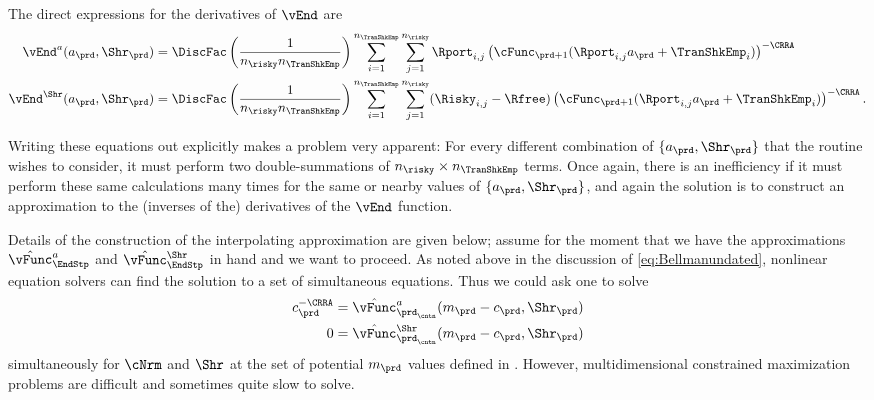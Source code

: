 The direct expressions for the derivatives of $\vEnd$ are
\begin{equation}\begin{gathered}\begin{aligned}
      \vEnd^{{a}}({a}_{\prd},\Shr_{\prd})  & = \DiscFac \left(\frac{1}{n_{\risky} n_{\TranShkEmp}}\right)\sum_{i=1}^{n_{\TranShkEmp}}\sum_{j=1}^{n_{\risky} }\Rport_{i,j} \left(\cFunc_{\prd+1}(\Rport_{i,j}{a}_{\prd}+\TranShkEmp_{i})\right)^{-\CRRA}
      \\      \vEnd^{\Shr}({a}_{\prd},\Shr_{\prd})  & = \DiscFac \left(\frac{1}{n_{\risky} n_{\TranShkEmp}}\right)\sum_{i=1}^{n_{\TranShkEmp}}\sum_{j=1}^{n_{\risky} }(\Risky_{i,j}-\Rfree)\left(\cFunc_{\prd+1}(\Rport_{i,j}{a}_{\prd}+\TranShkEmp_{i})\right)^{-\CRRA}.
    \end{aligned}\end{gathered}\end{equation}

Writing these equations out explicitly makes a problem very apparent: For every different combination of $\{{a}_{\prd},\Shr_{\prd}\}$ that the routine wishes to consider, it must perform two double-summations of $n_{\risky} \times n_{\TranShkEmp}$ terms.  Once again, there is an inefficiency if it must perform these same calculations many times for the same or nearby values of $\{{a}_{\prd},\Shr_{\prd}\}$, and again the solution is to construct an approximation to the (inverses of the) derivatives of the $\vEnd$ function.

Details of the construction of the interpolating approximation are given below; assume for the moment that we have the approximations $\hat{\vFunc}_{\EndStp}^{{a}}$ and $\hat{\vFunc}_{\EndStp}^{\Shr}$ in hand and we want to proceed.  As noted above in the discussion of \eqref{eq:Bellmanundated}, nonlinear equation solvers can find the solution to a set of simultaneous equations.  Thus we could ask one to solve
\begin{equation}\begin{gathered}\begin{aligned}
      {c}_{\prd}^{-\CRRA}  & = \hat{\vFunc}^{a}_{{\prd_\cntn}}({m}_{\prd}-{c}_{\prd},\Shr_{\prd}) %
      \\      0  & = \hat{\vFunc}^{\Shr}_{{\prd_\cntn}}({m}_{\prd}-{c}_{\prd},\Shr_{\prd}) \label{eq:FOCwrtw}
    \end{aligned}\end{gathered}\end{equation}
simultaneously for $\cNrm$ and $\Shr$ at the set of potential ${m}_{\prd}$ values defined in {\mVec}. However, multidimensional constrained
maximization problems are difficult and sometimes quite slow to
solve.

